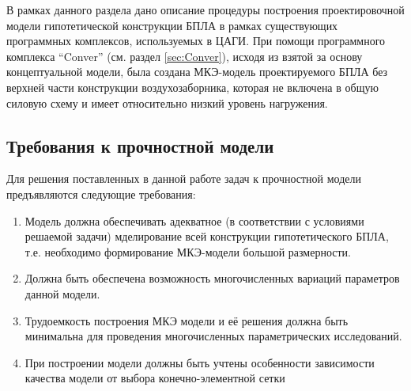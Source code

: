 
В рамках данного раздела дано описание процедуры построения проектировочной модели гипотетической конструкции БПЛА в рамках существующих программных комплексов, используемых в ЦАГИ. При помощи программного комплекса ``Conver'' (см. раздел \ref{sec:Conver}), исходя из взятой за основу концептуальной модели, была создана МКЭ-модель проектируемого БПЛА без верхней части конструкции воздухозаборника, которая не включена в общую силовую схему и имеет относительно низкий уровень нагружения.




\subsection{Требования к прочностной модели}

Для решения поставленных в данной работе задач к прочностной модели предъявляются следующие требования:



\begin{enumerate}
\item Модель должна обеспечивать адекватное (в соответствии с условиями решаемой задачи) мделирование всей конструкции гипотетического БПЛА, т.е. необходимо формирование МКЭ-модели большой размерности.
\item Должна быть обеспечена возможность многочисленных вариаций параметров данной модели.
\item Трудоемкость построения МКЭ модели и её решения должна быть минимальна для проведения многочисленных параметрических исследований.
\item При построении модели должны быть учтены особенности зависимости качества модели от выбора конечно-элементной сетки
\end{enumerate}

